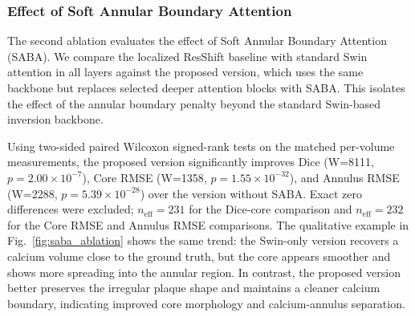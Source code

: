 \documentclass[singleLetter,times]{sagej}
\begin{document}
\subsubsection{Effect of Soft Annular Boundary Attention}

The second ablation evaluates the effect of Soft Annular Boundary Attention (SABA). We compare the localized ResShift baseline with standard Swin attention in all layers against the proposed version, which uses the same backbone but replaces selected deeper attention blocks with SABA. 
This isolates the effect of the annular boundary penalty beyond the standard Swin-based inversion backbone.

Using two-sided paired Wilcoxon signed-rank tests on the matched per-volume measurements, the proposed version significantly improves Dice (W=8111, $p=2.00\times10^{-7}$), Core RMSE (W=1358, $p=1.55\times10^{-32}$), and Annulus RMSE (W=2288, $p=5.39\times10^{-28}$) over the version without SABA. Exact zero differences were excluded; $n_{\mathrm{eff}}=231$ for the Dice-core comparison and $n_{\mathrm{eff}}=232$ for the Core RMSE and Annulus RMSE comparisons. The qualitative example in Fig.~\ref{fig:saba_ablation} shows the same trend: the Swin-only version recovers a calcium volume close to the ground truth, but the core appears smoother and shows more spreading into the annular region. In contrast, the proposed version better preserves the irregular plaque shape and maintains a cleaner calcium boundary, indicating improved core morphology and calcium-annulus separation.

\begin{table}[t]
\centering
\caption{Ablation study comparing the baseline version with Swin only and the proposed version. Metrics are aggregated over 232 unique 3D test cases from two held-out subjects; each case has a distinct plaque, anatomical background, calcium concentration, and exposure/noise combination. Fixed HU thresholds are used: calcium core $>850$ HU and annulus $(550,850]$ HU.}
\label{tab:saba_ablation}
\end{table}
\end{document}
